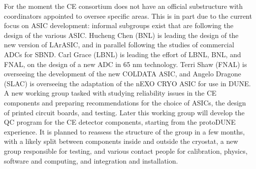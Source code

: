 For the moment the CE consortium does not have an official substructure
with coordinators appointed to oversee specific areas. This is in part due
to the current focus on ASIC development: informal subgroups exist that
are following the design of the various ASIC. Hucheng Chen (BNL) is leading the
design of the new version of LArASIC, and in parallel following the studies
of commercial ADCs for SBND. Carl Grace (LBNL) is leading the effort of
LBNL, BNL, and FNAL, on the design of a new ADC in 65 nm technology. Terri
Shaw (FNAL) is overseeing the development of the new COLDATA ASIC, and
Angelo Dragone (SLAC) is overseeing the adaptation of the nEXO CRYO ASIC
for use in DUNE. A new working group tasked with studying reliability
issues in the CE components and preparing recommendations for the choice
of ASICs, the design of printed circuit boards, and testing.
Later this working group will develop the QC program for the CE detector
components, starting from the protoDUNE experience.  It is planned to
reassess the structure of the group in a few months, with a likely split
between components inside and outside the cryostat, a new group responsible
for testing, and various contact people for calibration, physics, software and
computing, and integration and installation.
